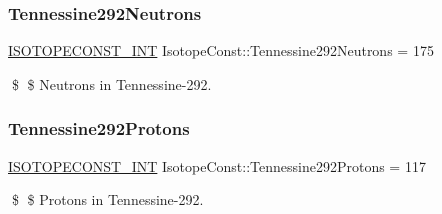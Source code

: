 \subsubsection{\texorpdfstring{Tennessine292\+Neutrons}{Tennessine292Neutrons}}
{\footnotesize\ttfamily \mbox{\hyperlink{group___isotope_const-_macros_ga5f18360b3e99483a35c32d789e62621c}{I\+S\+O\+T\+O\+P\+E\+C\+O\+N\+S\+T\+\_\+\+I\+NT}} Isotope\+Const\+::\+Tennessine292\+Neutrons = 175}

\$ \$ Neutrons in Tennessine-\/292. \mbox{\label{group___isotope_const-_tennessine-_ts292_ga8b01479e389b51ec5d2c2a11e9e1d742}} 
\subsubsection{\texorpdfstring{Tennessine292\+Protons}{Tennessine292Protons}}
{\footnotesize\ttfamily \mbox{\hyperlink{group___isotope_const-_macros_ga5f18360b3e99483a35c32d789e62621c}{I\+S\+O\+T\+O\+P\+E\+C\+O\+N\+S\+T\+\_\+\+I\+NT}} Isotope\+Const\+::\+Tennessine292\+Protons = 117}

\$ \$ Protons in Tennessine-\/292. 